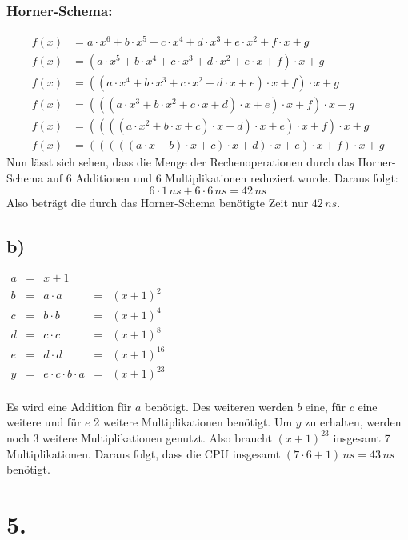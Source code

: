 \documentclass[a4paper]{scrartcl}
\begin{document}
    	\subsubsection{Horner-Schema:}
			\begin{align}
				f(x)&= a\cdot x^6+b\cdot x^5+ c\cdot x^4+d \cdot x^3+e\cdot x^2+ f\cdot x + g \\
				f(x)&= (a\cdot x^5+b\cdot x^4+ c\cdot x^3+d \cdot x^2+e\cdot x+ f) \cdot x + g \\
				f(x)&= ((a\cdot x^4+b\cdot x^3+ c\cdot x^2+d \cdot x+e)\cdot x+ f) \cdot x + g \\
				f(x)&= (((a\cdot x^3+b\cdot x^2+ c\cdot x+d) \cdot x+e)\cdot x+ f) \cdot x + g \\
				f(x)&= ((((a\cdot x^2+b\cdot x+ c)\cdot x+d) \cdot x+e)\cdot x+ f) \cdot x + g \\
				f(x)&= (((((a\cdot x+b)\cdot x+ c)\cdot x+d) \cdot x+e)\cdot x+ f) \cdot x + g 
			\end{align}			    
			Nun lässt sich sehen, dass die Menge der Rechenoperationen durch das Horner-Schema auf 
			\(6\) Additionen und \(6\) Multiplikationen reduziert wurde. Daraus folgt:
			\[6\cdot 1\, ns+6\cdot 6\, ns=42\, ns\]
			Also beträgt die durch das Horner-Schema benötigte Zeit nur \(42\, ns\).
				
	\subsection{b)}
		\(		
		\begin{array}{rcccl}
			a&=&x+1	\\
			b&=&a\cdot a &=& (x+1)^2 \\
			c&=&b\cdot b &=& (x+1)^4 \\
			d&=&c\cdot c &=& (x+1)^8 \\
			e&=&d\cdot d &=& (x+1)^{16} \\
			y&=&e\cdot c\cdot b \cdot a &=& (x+1)^{23} 
		\end{array}
		\) \\ \\
		Es wird eine Addition für  \(a\) benötigt. Des weiteren werden \(b\) eine, für \(c\) eine 
		weitere und für \(e\) 2 weitere Multiplikationen benötigt. Um \(y\) zu erhalten, werden noch 
		3 weitere Multiplikationen genutzt. Also braucht \((x+1)^{23}\) insgesamt 7 Multiplikationen.
		Daraus folgt, dass die CPU insgesamt \((7\cdot 6+1)\, ns=43\, ns\) benötigt.
		
		
		
\section{5.}	
\end{document}
